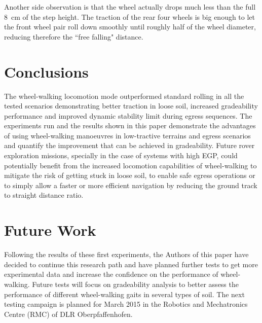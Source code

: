 \documentclass[a4paper,twocolumn]{esapub2005} %
\begin{document}
Another side observation is that the wheel actually drops much less than the
full 8~\unit{cm} of the step height. The traction of the rear four wheels is big enough to
let the front wheel pair roll down smoothly until roughly half of the wheel
diameter, reducing therefore the ``free falling" distance.


\section{Conclusions}
The wheel-walking locomotion mode outperformed standard rolling in all the
tested scenarios demonstrating better traction in loose soil, increased
gradeability performance and improved dynamic stability limit during egress
sequences. The experiments run and the results shown in this paper demonstrate
the advantages of using wheel-walking manoeuvres in low-tractive terrains and
egress scenarios and quantify the improvement that can be achieved in
gradeability.  Future rover exploration missions, specially in the case of
systems with high EGP, could potentially benefit from the increased locomotion
capabilities of wheel-walking to mitigate the risk of getting stuck in loose
soil, to enable safe egress operations or to simply allow a faster or more
efficient navigation by reducing the ground track to straight distance ratio.

\section{Future Work}
Following the results of these first experiments, the Authors of this paper have decided to
continue this research path and have planned further tests to get more
experimental data and increase the confidence on the performance of
wheel-walking.  Future tests will focus on gradeability analysis to better
assess the performance of different wheel-walking gaits in several types of
soil.  The next testing campaign is planned for March 2015 in the Robotics
and Mechatronics Centre (RMC) of DLR Oberpfaffenhofen.


\vspace{-3 mm}




\end{document}
